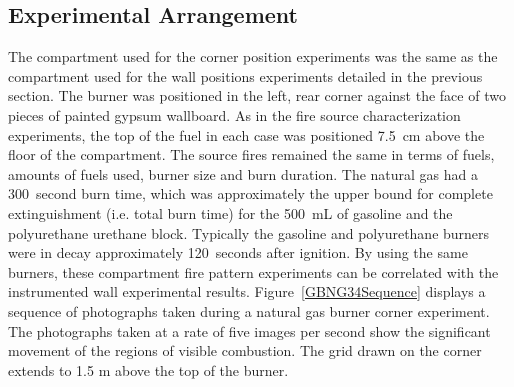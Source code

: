 \documentclass[twoside]{uocthesis}
\begin{document}
{\subsection{Experimental Arrangement}

The compartment used for the corner position experiments was the same as the compartment used for the wall positions experiments detailed in the previous section.  The burner was positioned in the left, rear corner against the face of two pieces of painted gypsum wallboard. As in the fire source characterization experiments, the top of the fuel in each case was positioned 7.5~cm above the floor of the compartment. The source fires remained the same in terms of fuels, amounts of fuels used, burner size and burn duration.  The natural gas had a 300~second burn time, which was approximately the upper bound for complete extinguishment (i.e. total burn time) for the 500~mL of gasoline and the polyurethane urethane block. Typically the gasoline and polyurethane burners were in decay approximately 120~seconds after ignition. By using the same burners, these compartment fire pattern experiments can be correlated with the instrumented wall experimental results.  Figure~\ref{GBNG34Sequence} displays a sequence of photographs taken during a natural gas burner corner experiment.  The photographs taken at a rate of five images per second show the significant movement of the regions of visible combustion.  The grid drawn on the corner extends to 1.5 m above the top of the burner. 

}
\end{document}
